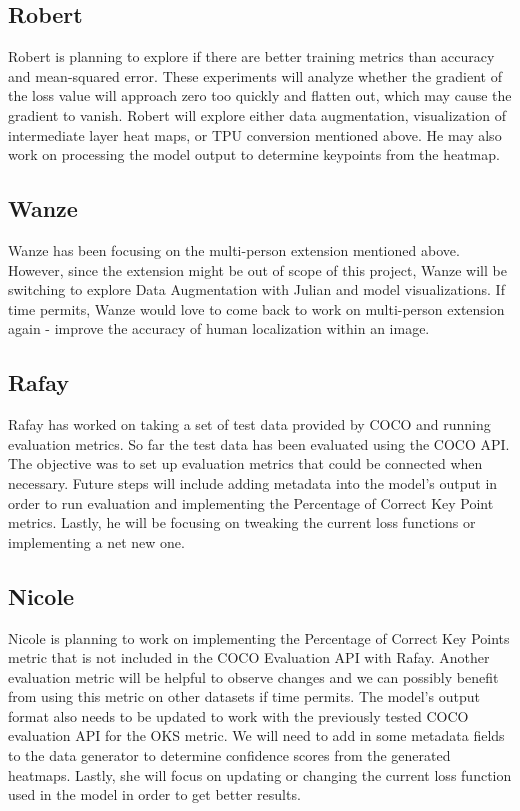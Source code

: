 \documentclass[11pt, letterpaper]{article}
\begin{document}
\subsection{Robert}
Robert is planning to explore if there are better training metrics than accuracy and mean-squared error. These experiments will analyze whether the gradient of the loss value will approach zero too quickly and flatten out, which may cause the gradient to vanish. Robert will explore either data augmentation, visualization of intermediate layer heat maps, or TPU conversion mentioned above. He may also work on processing the model output to determine keypoints from the heatmap. 

\subsection{Wanze}
Wanze has been focusing on the multi-person extension mentioned above. However, since the extension might be out of scope of this project, Wanze will be switching to explore Data Augmentation with Julian and model visualizations. If time permits, Wanze would love to come back to work on  multi-person extension again - improve the accuracy of human localization within an image. 

\subsection{Rafay}
Rafay has worked on taking a set of test data provided by COCO and running evaluation metrics. So far the test data has been evaluated using the COCO API. The objective was to set up evaluation metrics that could be connected when necessary. Future steps will include adding metadata into the model’s output in order to run evaluation and implementing the Percentage of Correct Key Point metrics. Lastly, he will be focusing on tweaking the current loss functions or implementing a net new one.   

\subsection{Nicole}
Nicole is planning to work on implementing the Percentage of Correct Key Points metric that is not included in the COCO Evaluation API with Rafay. Another evaluation metric will be helpful to observe changes and we can possibly benefit from using this metric on other datasets if time permits. The model’s output format also needs to be updated to work with the previously tested COCO evaluation API for the OKS metric. We will need to add in some metadata fields to the data generator to determine confidence scores from the generated heatmaps. Lastly, she will focus on updating or changing the current loss function used in the model in order to get better results.
\end{document}
